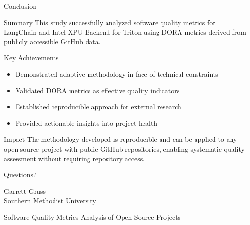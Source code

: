 \documentclass[aspectratio=169]{beamer}
\begin{document}
\begin{frame}{Conclusion}
  \begin{block}{Summary}
    This study successfully analyzed software quality metrics for LangChain and Intel XPU Backend for Triton using DORA metrics derived from publicly accessible GitHub data.
  \end{block}

  \begin{block}{Key Achievements}
    \begin{itemize}
      \item Demonstrated adaptive methodology in face of technical constraints
      \item Validated DORA metrics as effective quality indicators
      \item Established reproducible approach for external research
      \item Provided actionable insights into project health
    \end{itemize}
  \end{block}

  \begin{block}{Impact}
    The methodology developed is reproducible and can be applied to any open source project with public GitHub repositories, enabling systematic quality assessment without requiring repository access.
  \end{block}
\end{frame}

\begin{frame}
  \centering
  \Huge Questions?

  \vspace{1cm}
  \normalsize
  Garrett Gruss \\
  Southern Methodist University

  \vspace{0.5cm}
  \small
  Software Quality Metrics Analysis of Open Source Projects
\end{frame}
\end{document}

